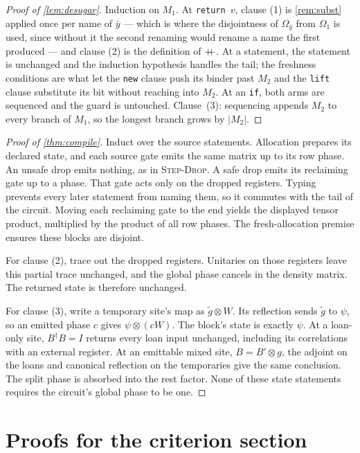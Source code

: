 \documentclass[acmsmall,screen,review,anonymous,nonacm]{acmart}
\begin{document}
\begin{proof}[Proof of \cref{lem:desugar}]
Induction on $M_1$. At \texttt{return }$v$, clause (1) is \cref{rem:subst} applied
once per name of $\bar y$ --- which is where the disjointness of $\Omega_{\bar y}$
from $\Omega_1$ is used, since without it the second renaming would rename a name the
first produced --- and clause (2) is the definition of $\mathbin{+\mkern-8mu+}$. At a statement, the
statement is unchanged and the induction hypothesis handles the tail; the freshness
conditions are what let the \texttt{new} clause push its binder past $M_2$ and the
\texttt{lift} clause substitute its bit without reaching into $M_2$. At an
\texttt{if}, both arms are sequenced and the guard is untouched. Clause~(3): sequencing appends $M_2$ to every branch of $M_1$, so the
longest branch grows by $|M_2|$.
\end{proof}

\begin{proof}[Proof of \cref{thm:compile}]
Induct over the source statements. Allocation prepares its declared state,
and each source gate emits the same matrix up to its row phase. An unsafe
drop emits nothing, as in \textsc{Step-Drop}. A safe drop emits its
reclaiming gate up to a phase. That gate acts only on the dropped
registers. Typing prevents every later statement from naming them, so it
commutes with the tail of the circuit. Moving each reclaiming gate to the
end yields the displayed tensor product, multiplied by the product of all
row phases. The fresh-allocation premise ensures these blocks are disjoint.

For clause (2), trace out the dropped registers. Unitaries on those
registers leave this partial trace unchanged, and the global phase
cancels in the density matrix. The returned state is therefore unchanged.

For clause (3), write a temporary site's map as $\tilde g\otimes W$.
Its reflection sends $\tilde g$ to $\psi$, so an emitted phase $c$ gives
$\psi\otimes(cW)$. The block's state is exactly $\psi$. At a loan-only
site, $B^{\dagger}B=I$ returns every loan input unchanged, including its
correlations with an external register. At an emittable mixed site,
$B=B'\otimes g$, the adjoint on the loans and canonical reflection on the
temporaries give the same conclusion. The split phase is absorbed into
the rest factor. None of these state statements requires the circuit's
global phase to be one.
\end{proof}

\section{Proofs for the criterion section}\label{app:criterion}
\end{document}
